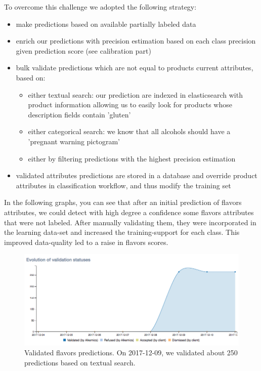 To overcome this challenge we adopted the following strategy:

\begin{itemize}
	\item make predictions based on available partially labeled data
	\item enrich our predictions with precision estimation based on each class precision given prediction score (see calibration part)
	\item bulk validate predictions which are not equal to products current attributes, based on:
	\begin{itemize}
		\item either textual search: our prediction are indexed in elasticsearch with product information allowing us to easily look for products whose description fields contain 'gluten'
		\item either categorical search: we know that all alcohols should have a 'pregnant warning pictogram'
		\item either by filtering predictions with the highest precision estimation
	\end{itemize}
	\item validated attributes predictions are stored in a database and override product attributes in classification workflow, and thus modify the training set
\end{itemize}

In the following graphs, you can see that after an initial prediction of flavors attributes, we could detect with high degree a confidence some flavors attributes that were not labeled. After manually validating them, they were incorporated in the learning data-set and increased the training-support for each class. This improved data-quality led to a raise in flavors scores.

\begin{figure}[H]
\centering
\includegraphics[scale=0.5]{./images/incompletely-labeled/validation-flavors.png}
\caption{Validated flavors predictions. On 2017-12-09, we validated about 250 predictions based on textual search.}
\end{figure}


